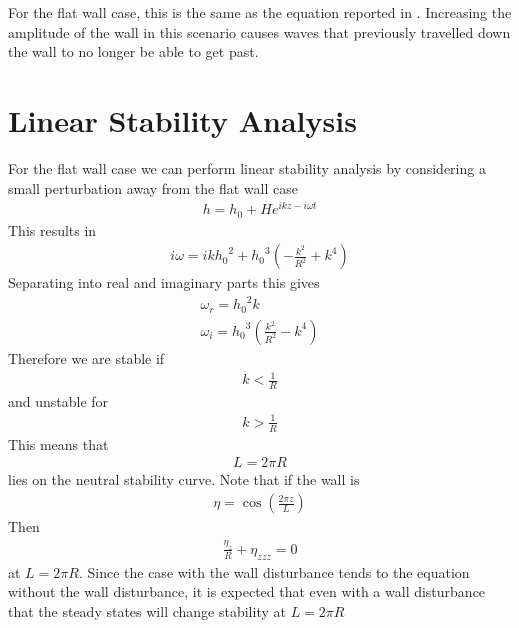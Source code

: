 \documentclass{jfm}
\begin{document}
	For the flat wall case, this is the same as the equation reported in \cite{CRASTER_2006,kalliadasis_chang_1994}.
	Increasing the amplitude of the wall in this scenario causes waves that previously travelled down the wall to no longer be able to get past.
\section{Linear Stability Analysis}
For the flat wall case we can perform linear stability analysis by considering a small perturbation away from the flat wall case
\begin{align}
	h = h_0 + H e^{ikz - i\omega t}
\end{align}
This results in 
\begin{align}
	i\omega = ik {h_0}^2 + {h_0}^3\left(-\frac{k^2}{R^2 }+k^4\right)
\end{align}
Separating into real and imaginary parts this gives 
\begin{align}
	\omega_r = {h_0}^2 k\\
	\omega_i = {h_0}^3\left(\frac{k^2}{R^2}-k^4\right)
\end{align}
Therefore we are stable if 
\begin{align}
	k<\frac{1}{R}
\end{align}and unstable for 
\begin{align}
	k>\frac{1}{R}
\end{align}
This means that 
\begin{align}
	L = 2\pi R
\end{align}
lies on the neutral stability curve. 
Note that if the wall is 
\begin{align}
	\eta  = \cos\left(\frac{2\pi z}{L}\right)
\end{align}
Then
\begin{align}
	\frac{\eta_z }{R}+ \eta_{zzz} = 0
\end{align}
at $L = 2\pi R$. 
Since the case with the wall disturbance tends to the equation without the wall disturbance, it is expected that even with a wall disturbance that the steady states will change stability at $L = 2\pi R$
\end{document}

